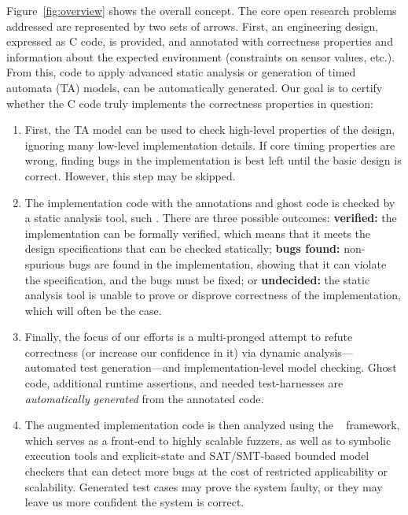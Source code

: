 Figure~\ref{fig:overview} shows the overall concept.  The core
open research problems addressed are represented by two sets of
arrows.  First, an engineering design, expressed as C code, is
provided, and annotated with correctness properties and information
about the expected environment (constraints on sensor values, etc.).
From this, code to apply advanced static analysis or generation of timed
automata (TA) models, can be automatically generated.  
Our goal is to certify whether the C code truly implements the
correctness properties in question:
\begin{enumerate}[labelsep=3pt,leftmargin=12pt]
\item First, the TA model can be used to check high-level properties
  of the design, ignoring many low-level implementation details.  If
  core timing properties are wrong, finding bugs in the implementation
  is best left until the basic design is correct.  However, this step
  may be skipped.
\item The implementation code with the \acsl annotations and ghost code
  is checked by a static analysis tool, such \framac.
  There are three possible outcomes:
  {\bf verified:} the implementation can be formally verified, which
  means that it meets the design specifications that can be checked statically;
  {\bf bugs found:} non-spurious bugs are found in the implementation, showing that
    it can violate the specification, and the bugs must be fixed; or
  {\bf undecided:} the static analysis tool is unable to prove or
  disprove correctness of the implementation, which will often be the case.
\item Finally, the focus of our efforts is a multi-pronged attempt to refute correctness (or increase our confidence
  in it) via dynamic analysis---automated test generation---and
  implementation-level model checking.
  Ghost code, additional runtime assertions, and needed test-harnesses are \emph{automatically generated} from the
  annotated code.
\item The augmented implementation code is then analyzed using the
  \deepstate~\cite{DeepState} framework, which serves as a front-end
  to highly scalable fuzzers, as well as to symbolic execution tools
  and explicit-state and SAT/SMT-based bounded model checkers that can
  detect more bugs at the cost of restricted applicability or scalability.  Generated test cases may
  prove the system faulty, or they may leave us more confident
  the system is correct.
\end{enumerate}

